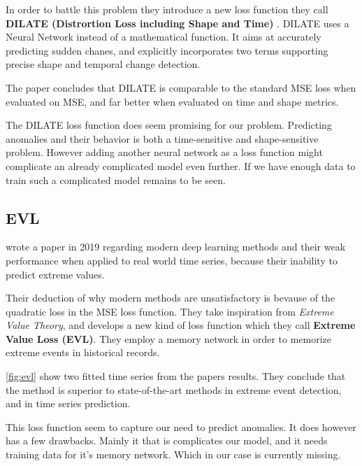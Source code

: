 In order to battle this problem they introduce a new loss function they call 
\textbf{DILATE (Distrortion Loss including Shape and Time)} \cite{Guen2019}.
DILATE uses a Neural Network instead of a mathematical function. 
It aims at accurately predicting sudden chanes, and explicitly incorporates two terms
supporting precise shape and temporal change detection.

The paper concludes that DILATE is comparable to the standard MSE loss when evaluated on MSE,
and far better when evaluated on time and shape metrics.

The DILATE loss function does seem promising for our problem. Predicting anomalies and their behavior
is both a time-sensitive and shape-sensitive problem. However adding another neural network as a loss function
might complicate an already complicated model even further.
If we have enough data to train such a complicated model remains to be seen. 


\subsection{EVL}
\citeauthor{Ding2019} wrote a paper in 2019 regarding modern deep learning methods and their
weak performance when applied to real world time series, because their inability to predict extreme values.

Their deduction of why modern methods are unsatisfactory is bevause of the quadratic loss in 
the MSE loss function.
They take inspiration from \textit{Extreme Value Theory}, and develops a new kind of loss function
which they call \textbf{Extreme Value Loss (EVL)}.
They employ a memory network in order to memorize extreme events in historical records.

\autoref{fig:evl} show two fitted time series from the papers results. They conclude
that the method is superior to state-of-the-art methods in extreme event detection, and 
in time series prediction.

This loss function seem to capture our need to predict anomalies.
It does however has a few drawbacks. Mainly it that is complicates our model, and it needs training data for it's memory network. 
Which in our case is currently missing. 


